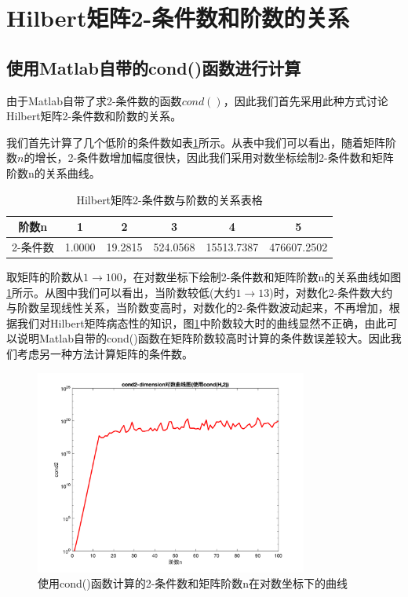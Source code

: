 \documentclass[a4paper]{article}
\begin{document}
\section{Hilbert矩阵2-条件数和阶数的关系}
\subsection{使用Matlab自带的cond()函数进行计算}
由于Matlab自带了求2-条件数的函数$cond()$，因此我们首先采用此种方式讨论Hilbert矩阵2-条件数和阶数的关系。

我们首先计算了几个低阶的条件数如表\ref{tab:table1}所示。从表中我们可以看出，随着矩阵阶数$n$的增长，2-条件数增加幅度很快，因此我们采用对数坐标绘制2-条件数和矩阵阶数n的关系曲线。

\begin{table}[htbp]
	\centering
	\caption{Hilbert矩阵2-条件数与阶数的关系表格}
	\label{tab:table1}
	\begin{tabular}{|c|c|c|c|c|c|}
		\hline
		阶数n & 1 & 2 & 3 & 4 & 5 \\
		\hline
		2-条件数 & 1.0000 & 19.2815 & 524.0568 & 15513.7387 & 476607.2502\\
		\hline
	\end{tabular}
\end{table}

取矩阵的阶数从$1\to100$，在对数坐标下绘制2-条件数和矩阵阶数n的关系曲线如图\ref{fig:1}所示。从图中我们可以看出，当阶数较低(大约$1\to 13$)时，对数化2-条件数大约与阶数呈现线性关系，当阶数变高时，对数化的2-条件数波动起来，不再增加，根据我们对Hilbert矩阵病态性的知识，图\ref{fig:1}中阶数较大时的曲线显然不正确，由此可以说明Matlab自带的cond()函数在矩阵阶数较高时计算的条件数误差较大。因此我们考虑另一种方法计算矩阵的条件数。

\begin{figure}[!h]
	\centering
	\includegraphics[width=0.8\textwidth]{../code/result/logcond2}
	\caption{\label{fig:1}使用cond()函数计算的2-条件数和矩阵阶数n在对数坐标下的曲线}
\end{figure}
\end{document}
